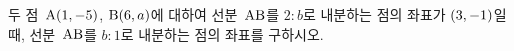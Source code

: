 두 점~$\mathrm{A}(1{,}\mkern3mu\mathopen{}-5)$, $\mathrm{B}(6{,}\mkern3mu\mathopen{}a)$에 대하여 선분~$\mathrm{AB}$를 $2:b$로 내분하는 점의 좌표가 $(3{,}\mkern3mu\mathopen{}-1)$일 때, 선분~$\mathrm{AB}$를 $b:1$로 내분하는 점의 좌표를 구하시오.
